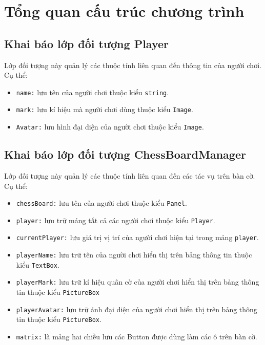 \chapter{Tổng quan cấu trúc chương trình}
\setlength{\epigraphwidth}{0.5\textwidth}

\section{Khai báo lớp đối tượng Player}
Lớp đối tượng này quản lý các thuộc tính liên quan đến thông tin của người chơi. Cụ thể:
\begin{itemize}
	\item \texttt{name:} lưu tên của người chơi thuộc kiểu \texttt{string}.
	\item \texttt{mark:} lưu kí hiệu mà người chơi dùng thuộc kiểu \texttt{Image}.
	\item \texttt{Avatar:} lưu hình đại diện của người chơi thuộc kiểu \texttt{Image}.
\end{itemize}
\section{Khai báo lớp đối tượng ChessBoardManager}
Lớp đối tượng này quản lý các thuộc tính liên quan đến các tác vụ trên bàn cờ. Cụ thể:
\begin{itemize}
	\item \texttt{chessBoard:} lưu tên của người chơi thuộc kiểu \texttt{Panel}.
	\item \texttt{player:} lưu trữ mảng tất cả các người chơi thuộc kiểu \texttt{Player}.
	\item \texttt{currentPlayer:} lưu giá trị vị trí của người chơi hiện tại trong mảng \texttt{player}.
	\item \texttt{playerName:} lưu trữ tên của người chơi hiển thị trên bảng thông tin thuộc kiểu \texttt{TextBox}.
	\item \texttt{playerMark:} lưu trữ kí hiệu quân cờ của người chơi hiển thị trên bảng thông tin thuộc kiểu \texttt{PictureBox}
	\item \texttt{playerAvatar:} lưu trữ ảnh đại diện của người chơi hiển thị trên bảng thông tin thuộc kiểu \texttt{PictureBox}.
	\item \texttt{matrix:} là mảng hai chiều lưu các Button được dùng làm các ô trên bàn cờ.
\end{itemize}

